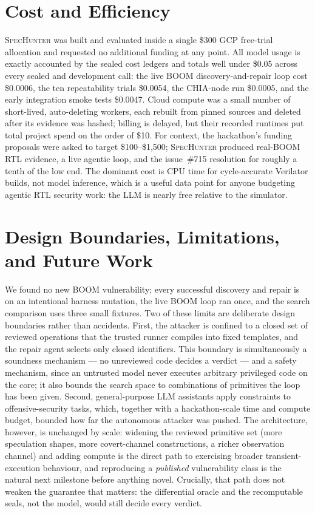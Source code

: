 \documentclass[conference,10pt]{IEEEtran}
\newcommand{\sh}{\textsc{SpecHunter}}
\begin{document}
\section{Cost and Efficiency}\label{sec:cost}
\sh{} was built and evaluated inside a single \$300 GCP free-trial allocation and
requested no additional funding at any point. All model usage is exactly accounted
by the sealed cost ledgers and totals well under \$0.05 across every sealed and
development call: the live BOOM discovery-and-repair loop cost \$0.0006, the ten
repeatability trials \$0.0054, the CHIA-node run \$0.0005, and the early
integration smoke tests \$0.0047. Cloud compute was a small number of
short-lived, auto-deleting workers, each rebuilt from pinned sources and deleted
after its evidence was hashed; billing is delayed, but their recorded runtimes put
total project spend on the order of \$10. For context, the hackathon's funding
proposals were asked to target \$100--\$1{,}500; \sh{} produced real-BOOM RTL
evidence, a live agentic loop, and the issue~\#715 resolution for roughly a tenth
of the low end. The dominant cost is CPU time for cycle-accurate Verilator builds,
not model inference, which is a useful data point for anyone budgeting agentic RTL
security work: the LLM is nearly free relative to the simulator.

\section{Design Boundaries, Limitations, and Future Work}\label{sec:limits}
We found no new BOOM vulnerability; every successful discovery and repair is on an
intentional harness mutation, the live BOOM loop ran once, and the search
comparison uses three small fixtures. Two of these limits are deliberate design
boundaries rather than accidents. First, the attacker is confined to a closed set
of reviewed operations that the trusted runner compiles into fixed templates, and
the repair agent selects only closed identifiers. This boundary is simultaneously
a soundness mechanism --- no unreviewed code decides a verdict --- and a safety
mechanism, since an untrusted model never executes arbitrary privileged code on
the core; it also bounds the search space to combinations of primitives the loop
has been given. Second, general-purpose LLM assistants apply constraints to
offensive-security tasks, which, together with a hackathon-scale time and compute
budget, bounded how far the autonomous attacker was pushed. The
architecture, however, is unchanged by scale: widening the reviewed primitive set
(more speculation shapes, more covert-channel constructions, a richer observation
channel) and adding compute is the direct path to exercising broader
transient-execution behaviour, and reproducing a \emph{published} vulnerability
class is the natural next milestone before anything novel. Crucially, that path
does not weaken the guarantee that matters: the differential oracle and the
recomputable seals, not the model, would still decide every verdict.
\end{document}
